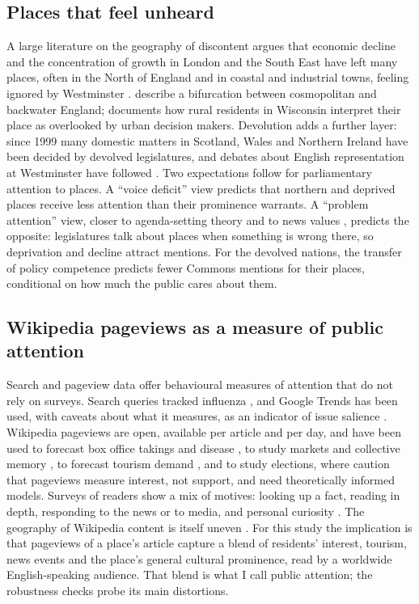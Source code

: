 \documentclass[11pt,a4paper]{article}
\begin{document}
\subsection{Places that feel unheard}
A large literature on the geography of discontent argues that economic decline and the concentration of growth in London and the South East have left many places, often in the North of England and in coastal and industrial towns, feeling ignored by Westminster \citep{RodriguezPose2018,McCann2020}. \citet{JenningsStoker2016} describe a bifurcation between cosmopolitan and backwater England; \citet{Cramer2016} documents how rural residents in Wisconsin interpret their place as overlooked by urban decision makers. Devolution adds a further layer: since 1999 many domestic matters in Scotland, Wales and Northern Ireland have been decided by devolved legislatures, and debates about English representation at Westminster have followed \citep{Kenny2014}. Two expectations follow for parliamentary attention to places. A ``voice deficit'' view predicts that northern and deprived places receive less attention than their prominence warrants. A ``problem attention'' view, closer to agenda-setting theory and to news values \citep{GaltungRuge1965}, predicts the opposite: legislatures talk about places when something is wrong there, so deprivation and decline attract mentions. For the devolved nations, the transfer of policy competence predicts fewer Commons mentions for their places, conditional on how much the public cares about them.

\subsection{Wikipedia pageviews as a measure of public attention}
Search and pageview data offer behavioural measures of attention that do not rely on surveys. Search queries tracked influenza \citep{Ginsberg2009}, and Google Trends has been used, with caveats about what it measures, as an indicator of issue salience \citep{Mellon2013}. Wikipedia pageviews are open, available per article and per day, and have been used to forecast box office takings \citep{Mestyan2013} and disease \citep{Generous2014}, to study markets \citep{Moat2013} and collective memory \citep{GarciaGavilanes2017}, to forecast tourism demand \citep{Khadivi2016}, and to study elections, where \citet{YasseriBright2016} caution that pageviews measure interest, not support, and need theoretically informed models. Surveys of readers show a mix of motives: looking up a fact, reading in depth, responding to the news or to media, and personal curiosity \citep{Singer2017,Lemmerich2019}. The geography of Wikipedia content is itself uneven \citep{Graham2014}. For this study the implication is that pageviews of a place's article capture a blend of residents' interest, tourism, news events and the place's general cultural prominence, read by a worldwide English-speaking audience. That blend is what I call public attention; the robustness checks probe its main distortions.
\end{document}
